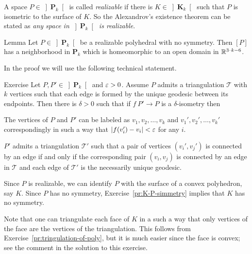 A space $P\in \left]\mathbf{P}_k\right[$ is called
\emph{realizable}
if there is $K\in \left]\mathbf{K}_k\right[$ such that $P$ is isometric to the surface of $K$.
So the Alexandrov's existence theorem can be stated as 
\emph{any space in $\left]\mathbf{P}_k\right[$ is realizable}.


\begin{thm}{Lemma}\label{lem:poly-mnfld}
Let $P\in\left]\mathbf{P}_k\right[$ be a realizable polyhedral with no symmetry. 
Then $[P]$ has a neighborhood in $\mathbf{P}_k$ which is homeomorphic to an open domain in $\RR^{3\cdot k-6}$.
\end{thm}

In the proof we will use the following technical statement.

\begin{thm}{Exercise}\label{ex:P,eps-delta}
Let $P, P'\in\left] \mathbf{P}_k\right[$ and $\varepsilon>0$.
Assume $P$ admits a triangulation $\mathcal{T}$ 
with $k$ vertices 
such that each edge is formed by the unique geodesic between its endpoints.
Then there is $\delta>0$ such that if $f\:P'\to P$ is a $\delta$-isometry then

\begin{subthm}{}
The vertices of $P$ and $P'$ can be labeled 
as $v_1,v_2,\dots,v_k$ and $v_1',v_2',\dots,v_k'$ correspondingly
in such a way that $|f(v_i')-v_i|<\varepsilon$ for any $i$.
\end{subthm}

\begin{subthm}{}
$P'$ admits a triangulation  $\mathcal{T}'$
such that a pair of vertices $(v_i',v_j')$ 
is connected by an edge if and only if 
the corresponding pair $(v_i,v_j)$ 
is connected by an edge in $\mathcal{T}$ 
and each edge of $\mathcal{T}'$ is the necessarily unique geodesic.
\end{subthm}
\end{thm}



Since $P$ is realizable, 
we can identify $P$ with the surface of a convex polyhedron, 
say $K$.  Since $P$ has no symmetry,
Exercise~\ref{pr:K-P-simmetry} implies that $K$ has no symmetry.

Note that one can triangulate each face of $K$ in
a such a way that only vertices of the face are the vertices of the triangulation.
This follows from Exercise~\ref{pr:tringulation-of-poly},
but it is much easier since the face is convex;
see the comment in the solution to this exercise.

